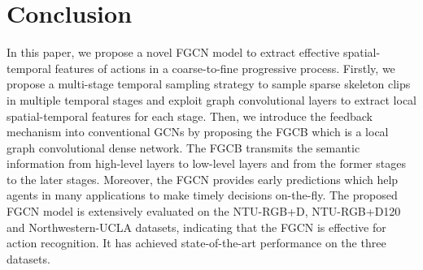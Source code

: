 \documentclass[runningheads]{llncs}
\begin{document}
\section{Conclusion}
In this paper, we propose a novel FGCN model to extract effective spatial-temporal features of actions in a coarse-to-fine progressive process. Firstly, we propose a multi-stage temporal sampling strategy to sample sparse skeleton clips in multiple temporal stages and exploit graph convolutional layers to extract local spatial-temporal features for each stage. Then, we introduce the feedback mechanism into conventional GCNs by proposing the FGCB which is a local graph convolutional dense network. The FGCB transmits the semantic information from high-level layers to low-level layers and from the former stages to the later stages. Moreover, the FGCN provides early predictions which help agents in many applications to make timely decisions on-the-fly.
The proposed FGCN model is extensively evaluated on the NTU-RGB+D, NTU-RGB+D120 and Northwestern-UCLA datasets, indicating that the FGCN is effective for action recognition. It has achieved state-of-the-art performance on the three datasets.




\end{document}
